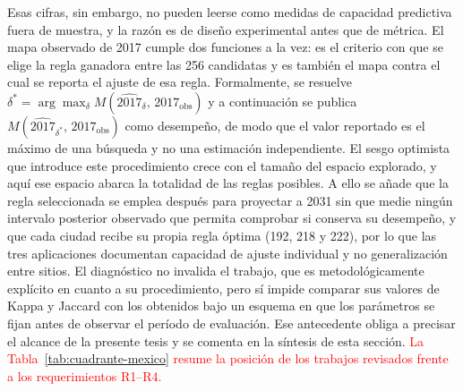 Esas cifras, sin embargo, no pueden leerse como medidas de capacidad
predictiva fuera de muestra, y la razón es de diseño experimental antes que de
métrica. El mapa observado de 2017 cumple dos funciones a la vez: es el
criterio con que se elige la regla ganadora entre las 256 candidatas y es
también el mapa contra el cual se reporta el ajuste de esa regla. Formalmente,
se resuelve
$\delta^{*} = \arg\max_{\delta} M(\widehat{2017}_{\delta},\,
2017_{\text{obs}})$ y a continuación se publica
$M(\widehat{2017}_{\delta^{*}},\,2017_{\text{obs}})$ como desempeño, de modo
que el valor reportado es el máximo de una búsqueda y no una estimación
independiente. El sesgo optimista que introduce este procedimiento crece con el
tamaño del espacio explorado, y aquí ese espacio abarca la totalidad de las
reglas posibles. A ello se añade que la regla seleccionada se emplea después
para proyectar a 2031 sin que medie ningún intervalo posterior observado que
permita comprobar si conserva su desempeño, y que cada ciudad recibe su propia
regla óptima (192, 218 y 222), por lo que las tres aplicaciones documentan
capacidad de ajuste individual y no generalización entre sitios. El diagnóstico
no invalida el trabajo, que es metodológicamente explícito en cuanto a su
procedimiento, pero sí impide comparar sus valores de Kappa y Jaccard con los
obtenidos bajo un esquema en que los parámetros se fijan antes de observar el
período de evaluación. Ese antecedente obliga a precisar el alcance de la
presente tesis y se comenta en la síntesis de esta sección.
\textcolor{red}{La Tabla~\ref{tab:cuadrante-mexico} resume la posición de los
trabajos revisados frente a los requerimientos R1--R4.}


